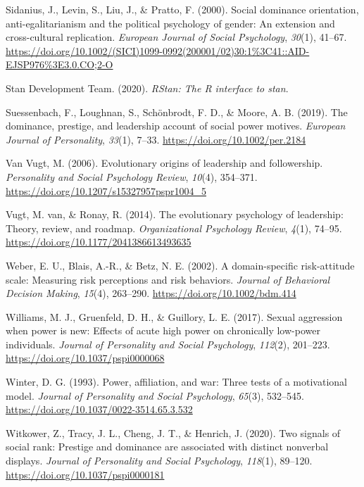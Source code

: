 \documentclass[
  donotrepeattitle,doc, 12pt, a4paper,floatsintext]{apa7}
\newlength{\cslhangindent}
\newlength{\cslentryspacingunit} %
\newenvironment{CSLReferences}[2] %
 {%
  \setlength{\parindent}{0pt}
  \ifodd #1
  \let\oldpar\par
  \def\par{\hangindent=\cslhangindent\oldpar}
  \fi
  \setlength{\parskip}{#2\cslentryspacingunit}
 }%
 {}
\begin{document}
\begin{CSLReferences}{1}{0}
\leavevmode{}%
Sidanius, J., Levin, S., Liu, J., \& Pratto, F. (2000). Social dominance orientation, anti-egalitarianism and the political psychology of gender: An extension and cross-cultural replication. \emph{European Journal of Social Psychology}, \emph{30}(1), 41--67. \url{https://doi.org/10.1002/(SICI)1099-0992(200001/02)30:1\%3C41::AID-EJSP976\%3E3.0.CO;2-O}

\leavevmode{}%
Stan Development Team. (2020). \emph{{RStan}: The {R} interface to stan}.

\leavevmode{}%
Suessenbach, F., Loughnan, S., Schönbrodt, F. D., \& Moore, A. B. (2019). The dominance, prestige, and leadership account of social power motives. \emph{European Journal of Personality}, \emph{33}(1), 7--33. \url{https://doi.org/10.1002/per.2184}

\leavevmode{}%
Van Vugt, M. (2006). Evolutionary origins of leadership and followership. \emph{Personality and Social Psychology Review}, \emph{10}(4), 354--371. \url{https://doi.org/10.1207/s15327957pspr1004_5}

\leavevmode{}%
Vugt, M. van, \& Ronay, R. (2014). The evolutionary psychology of leadership: Theory, review, and roadmap. \emph{Organizational Psychology Review}, \emph{4}(1), 74--95. \url{https://doi.org/10.1177/2041386613493635}

\leavevmode{}%
Weber, E. U., Blais, A.-R., \& Betz, N. E. (2002). A domain-specific risk-attitude scale: Measuring risk perceptions and risk behaviors. \emph{Journal of Behavioral Decision Making}, \emph{15}(4), 263--290. \url{https://doi.org/10.1002/bdm.414}

\leavevmode{}%
Williams, M. J., Gruenfeld, D. H., \& Guillory, L. E. (2017). Sexual aggression when power is new: Effects of acute high power on chronically low-power individuals. \emph{Journal of Personality and Social Psychology}, \emph{112}(2), 201--223. \url{https://doi.org/10.1037/pspi0000068}

\leavevmode{}%
Winter, D. G. (1993). Power, affiliation, and war: Three tests of a motivational model. \emph{Journal of Personality and Social Psychology}, \emph{65}(3), 532--545. \url{https://doi.org/10.1037/0022-3514.65.3.532}

\leavevmode{}%
Witkower, Z., Tracy, J. L., Cheng, J. T., \& Henrich, J. (2020). Two signals of social rank: Prestige and dominance are associated with distinct nonverbal displays. \emph{Journal of Personality and Social Psychology}, \emph{118}(1), 89--120. \url{https://doi.org/10.1037/pspi0000181}

\end{CSLReferences}
\end{document}
